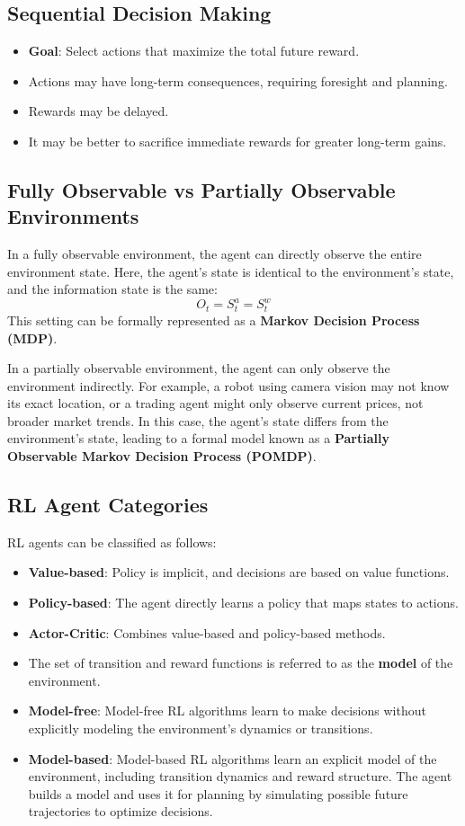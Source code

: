 \subsection{Sequential Decision Making}
\begin{itemize}
    \item \textbf{Goal}: Select actions that maximize the total future reward.
    \item Actions may have long-term consequences, requiring foresight and planning.
    \item Rewards may be delayed.
    \item It may be better to sacrifice immediate rewards for greater long-term gains.
\end{itemize}


\subsection{Fully Observable vs Partially Observable Environments}
In a fully observable environment, the agent can directly observe the entire environment state. Here, the agent’s state is identical to the environment's state, and the information state is the same:
$$O_t=S_t^a=S_t^w$$
This setting can be formally represented as a \textbf{Markov Decision Process (MDP)}.

In a partially observable environment, the agent can only observe the environment indirectly. For example, a robot using camera vision may not know its exact location, or a trading agent might only observe current prices, not broader market trends. In this case, the agent's state differs from the environment's state, leading to a formal model known as a \textbf{Partially Observable Markov Decision Process (POMDP)}.

\subsection{RL Agent Categories}
RL agents can be classified as follows:
\begin{itemize}
    \item \textbf{Value-based}: Policy is implicit, and decisions are based on value functions.
    \item \textbf{Policy-based}: The agent directly learns a policy that maps states to actions.
    \item \textbf{Actor-Critic}: Combines value-based and policy-based methods.
    \item The set of transition and reward functions is referred to as the \textbf{model} of the environment.
    \item \textbf{Model-free}: Model-free RL algorithms learn to make decisions without explicitly modeling the environment's dynamics or transitions.
    \item \textbf{Model-based}: Model-based RL algorithms learn an explicit model of the environment, including transition dynamics and reward structure. The agent builds a model and uses it for planning by simulating possible future trajectories to optimize decisions.
\end{itemize}

